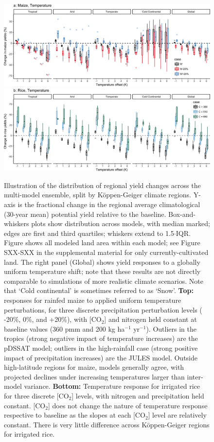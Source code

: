 \documentclass[gmd, manuscript]{copernicus} %
\begin{document}
\begin{figure}[ht]
\centering
   \includegraphics[width=15cm]{figures/maize_sim_CG_T.png}
   \includegraphics[width=15cm]{figures/rice_sim_CG_T.png}
   \caption{Illustration of the distribution of regional yield changes across the multi-model ensemble, split by K\"{o}ppen-Geiger climate regions.
  Y-axis is the fractional change in the regional average climatological (30-year mean) potential yield relative to the baseline. Box-and-whiskers plots show distribution across models, with median marked; edges are first and third quartiles; whiskers extend to 1.5$\cdot$IQR.
  Figure shows all modeled land area within each model; see Figure SXX-SXX in the supplemental material for only currently-cultivated land.
  The right panel (Global) shows yield responses to a globally uniform temperature shift; note that these results are not directly comparable to simulations of more realistic climate scenarios.
  Note that `Cold continental' is sometimes referred to as `Snow'. 
  \textbf{Top:} responses for rainfed maize to applied uniform temperature perturbations, for three discrete precipitation perturbation levels ( -20\%, 0\%, and +20\%), with [CO$_2$] and nitrogen held constant at baseline values (360 pmm and 200 kg ha$^{-1}$ yr$^{-1}$). 
  Outliers in the tropics (strong negative impact of temperature increases) are the pDSSAT model; outliers in the high-rainfall case (strong positive impact of precipitation increases) are the JULES model. 
  Outside high-latitude regions for maize, models generally agree, with projected declines under increasing temperatures larger than inter-model variance. 
  \textbf{Bottom:} Temperature response for irrigated rice for three discrete [CO$_2$] levels, with nitrogen and precipitation held constant. [CO$_2$] does not change the nature of temperature response respective to baseline as the slopes at each [CO$_2$] level are relatively constant.
  There is very little difference across K\"{o}ppen-Geiger regions for irrigated rice.}
   \label{fig:maizerice}
\end{figure}
\end{document}
